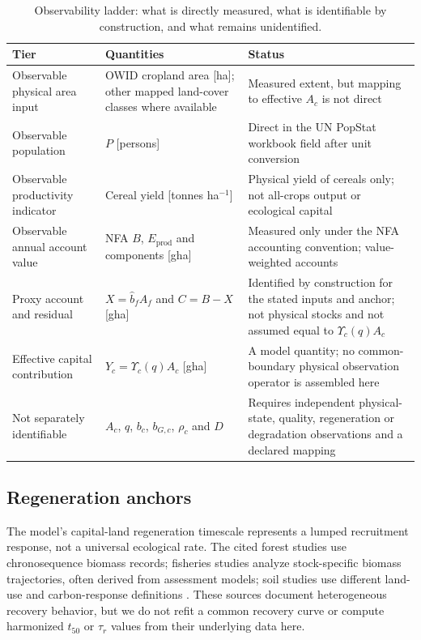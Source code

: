 \documentclass[11pt,a4paper]{article}
\newcommand{\Ups}{\Upsilon_c}
\begin{document}
\begin{table}[htbp]
\centering\small
\caption{Observability ladder: what is directly measured, what is identifiable by construction, and what remains unidentified.}
\label{tab:si_ladder}
\begin{tabularx}{\textwidth}{>{\raggedright\arraybackslash}p{} X >{\raggedright\arraybackslash}p{}}
\toprule
Tier & Quantities & Status \\
\midrule
Observable physical area input & OWID cropland area [ha]; other mapped land-cover classes where available & Measured extent, but mapping to effective $A_c$ is not direct \\
Observable population & $P$ [persons] & Direct in the UN PopStat workbook field after unit conversion \\
Observable productivity indicator & Cereal yield [tonnes ha$^{-1}$] & Physical yield of cereals only; not all-crops output or ecological capital \\
Observable annual account value & NFA $B$, $E_{\mathrm{prod}}$ and components [gha] & Measured only under the NFA accounting convention; value-weighted accounts \\
Proxy account and residual & $X=\hat b_fA_f$ and $C=B-X$ [gha] & Identified by construction for the stated inputs and anchor; not physical stocks and not assumed equal to $\Ups(q)A_c$ \\
Effective capital contribution & $Y_c=\Ups(q)A_c$ [gha] & A model quantity; no common-boundary physical observation operator is assembled here \\
Not separately identifiable & $A_c$, $q$, $b_c$, $b_{G,c}$, $\rho_c$ and $D$ & Requires independent physical-state, quality, regeneration or degradation observations and a declared mapping \\
\bottomrule
\end{tabularx}
\end{table}

\subsection{Regeneration anchors}\label{si:anchors}

The model's capital-land regeneration timescale represents a lumped recruitment response, not a universal ecological rate. The cited forest studies use chronosequence biomass records; fisheries studies analyze stock-specific biomass trajectories, often derived from assessment models; soil studies use different land-use and carbon-response definitions \citep{Poorter2016,HutchingsReynolds2004,Neubauer2013,Poeplau2011}. These sources document heterogeneous recovery behavior, but we do not refit a common recovery curve or compute harmonized $t_{50}$ or $\tau_r$ values from their underlying data here.
\end{document}
